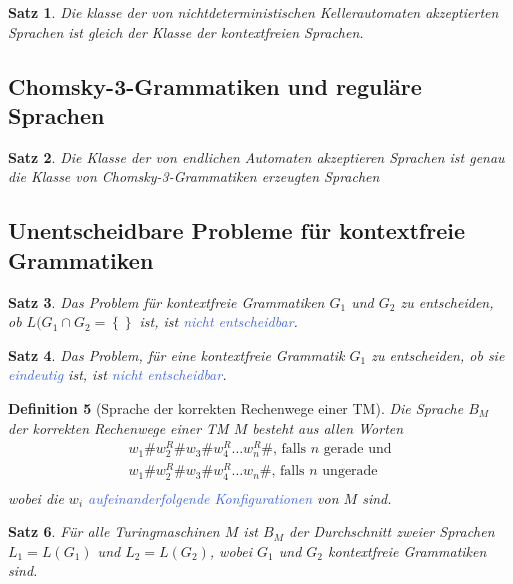 \documentclass[11pt]{scrartcl}
\newcommand{\tcol}[1]{\textcolor{RoyalBlue}{#1}}
\newcommand{\set}[1]{\left\lbrace #1\right\rbrace}
\theoremstyle{break}
\newtheorem{satz}{Satz}[section]
\newtheorem{defi}[satz]{Definition}
\begin{document}
    \begin{satz}
        Die klasse der von nichtdeterministischen Kellerautomaten akzeptierten Sprachen ist gleich der Klasse der kontextfreien Sprachen.
    \end{satz}


    \subsection{Chomsky-3-Grammatiken und reguläre Sprachen}
	\label{subsec:chomsky-3-grammatiken-und-reguläre-sprachen}

    \begin{satz}
        Die Klasse der von endlichen Automaten akzeptieren Sprachen ist genau die Klasse von Chomsky-3-Grammatiken erzeugten Sprachen
    \end{satz}


    \subsection{Unentscheidbare Probleme für kontextfreie Grammatiken}
	\label{subsec:unentscheidbare-probleme-für-kontextfreie-grammatiken}

    \begin{satz}
        Das Problem für kontextfreie Grammatiken $G_1$ und $G_2$ zu entscheiden, ob $L(G_1\cap G_2=\set{}$ ist, ist \tcol{nicht entscheidbar}.
    \end{satz}

    \begin{satz}
        Das Problem, für eine kontextfreie Grammatik $G_1$ zu entscheiden, ob sie \tcol{eindeutig} ist, ist \tcol{nicht entscheidbar}.
    \end{satz}

    \begin{defi}[Sprache der korrekten Rechenwege einer TM]
        Die Sprache $B_M$ der korrekten Rechenwege einer TM $M$ besteht aus allen Worten
        \begin{gather*}
            w_1\#w_2^R\#w_3\#w_4^R\dots w_n^R\#\text{, falls $n$ gerade und}\\
            w_1\#w_2^R\#w_3\#w_4^R\dots w_n\#\text{, falls $n$ ungerade}\\
        \end{gather*}
        wobei die $w_i$ \tcol{aufeinanderfolgende Konfigurationen} von $M$ sind.
    \end{defi}

    \begin{satz}
        Für alle Turingmaschinen $M$ ist $B_M$ der Durchschnitt zweier Sprachen $L_1=L(G_1)$ und $L_2=L(G_2)$, wobei $G_1$ und $G_2$ kontextfreie Grammatiken sind.
    \end{satz}
\end{document}
